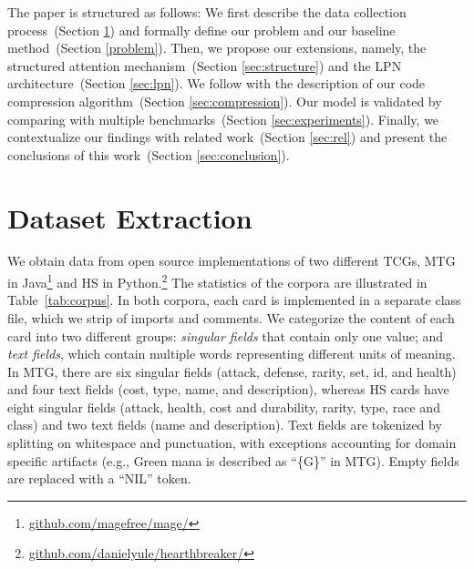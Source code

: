 \documentclass[11pt]{article}
\begin{document}
The paper is structured as follows: We first describe the data collection process~(Section \ref{sec:data}) and formally define our problem and our baseline method~(Section \ref{problem}). Then, we propose our extensions, namely, the structured attention mechanism~(Section \ref{sec:structure}) and the LPN architecture~(Section \ref{sec:lpn}). We follow with the description of our code compression algorithm~(Section \ref{sec:compression}). Our model is validated by comparing with multiple benchmarks~(Section \ref{sec:experiments}). Finally, we contextualize our findings with related work~(Section \ref{sec:rel}) and present the conclusions of this work~(Section \ref{sec:conclusion}).




















































\section{Dataset Extraction}
\label{sec:data}

We obtain data from open source implementations of two different TCGs, MTG in Java\footnote{\url{github.com/magefree/mage/}} and HS in Python.\footnote{\url{github.com/danielyule/hearthbreaker/}} The statistics of the corpora are illustrated in Table~\ref{tab:corpus}. In both corpora, each card is implemented in a separate class file, which we strip of imports and comments.
We categorize the content of each card into two different groups: \emph{singular fields} that contain only one value; and \emph{text fields}, which contain multiple words representing different units of meaning. In MTG, there are six singular fields (attack, defense, rarity, set, id, and health)
and four text fields (cost, type, name, and
description), whereas HS cards have eight singular
fields (attack, health, cost and durability, rarity,
type, race and class) and two text fields (name and description).
Text fields are tokenized by splitting on whitespace and punctuation,
with exceptions accounting for domain specific artifacts (e.g., Green mana is described as ``\{G\}'' in MTG).
Empty fields are replaced with a ``NIL'' token.
\end{document}
